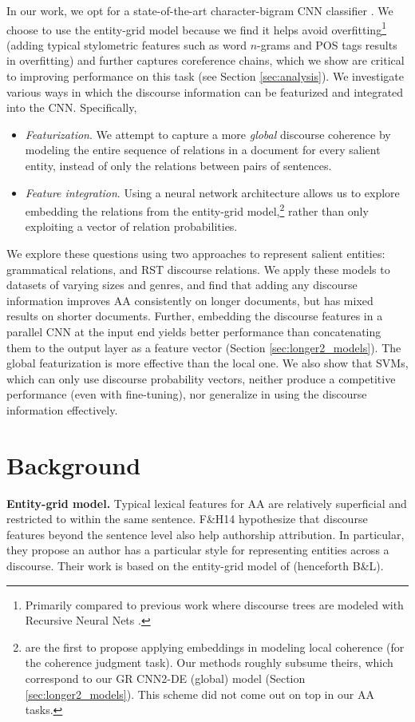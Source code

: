 In our work, we opt for a state-of-the-art character-bigram CNN classifier \cite{Shrestha:2017}. We choose to use the entity-grid model because we find it helps avoid overfitting\footnote{Primarily compared to previous work where discourse trees are modeled with Recursive Neural Nets \cite{Ji:2017}.} (adding typical stylometric features such as word $n$-grams and POS tags results in overfitting) and further captures coreference chains, which we show are critical to improving performance on this task (see 
Section \ref{sec:analysis}). We investigate various ways in which the discourse information can be featurized and integrated into the CNN.
Specifically,
\begin{itemize}
\item \emph{Featurization}. We attempt to capture a more \emph{global} discourse coherence by modeling the entire sequence of relations in a document for every salient entity, instead of only the relations between pairs of sentences. 
\item \emph{Feature integration}. Using a neural network architecture allows us to explore embedding the relations from the entity-grid model,\footnote{ are the first to propose applying embeddings in modeling local coherence (for the coherence judgment task). Our methods roughly subsume theirs, which correspond to our GR CNN2-DE (global) model (Section \ref{sec:longer2_models}). This scheme did not come out on top in our AA tasks.} rather than only exploiting a vector of relation probabilities. 
\end{itemize}

We explore these questions using two approaches to represent salient entities: grammatical relations, and RST discourse relations. We apply these models to datasets of varying sizes and genres, and find that adding any discourse information improves AA consistently on longer documents, but has mixed results on shorter documents. Further, embedding the discourse features in a parallel CNN at the input end yields better performance than concatenating them to the output layer as a feature vector (Section \ref{sec:longer2_models}). The global featurization is more effective than the local one.
We also show that SVMs, which can only use discourse probability vectors, neither produce a competitive performance (even with fine-tuning), nor generalize in using the discourse information effectively.

\section{Background}
\label{sec:background}
\textbf{Entity-grid model.} Typical lexical features for AA are relatively superficial and restricted to within the same sentence. F\&H14 hypothesize that discourse features beyond the sentence level also help authorship attribution. In particular, they propose an author has a particular style for representing entities across a discourse. Their work is based on the entity-grid model of \citet{Barzilay:2008} (henceforth B\&L). 

